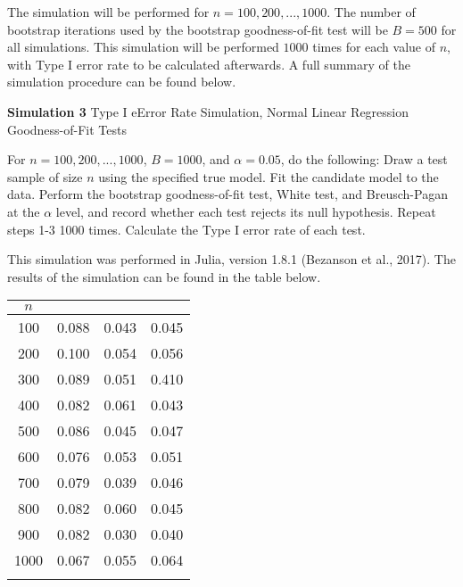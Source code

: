 		The simulation will be performed for $n = 100,200,...,1000$. The number of bootstrap iterations used by the bootstrap goodness-of-fit test will be $B = 500$ for all simulations.
		This simulation will be performed $1000$ times for each value of $n$, with Type I error rate to be calculated afterwards. A full summary of the simulation procedure can be found below.
		\begin{algorithm}[H]
			\caption*{\textbf{Simulation 3} Type I eError Rate Simulation, Normal Linear Regression Goodness-of-Fit Tests}
			\begin{algorithmic}[1]
			  \Statex For $n = 100,200,...,1000$, $B = 1000$, and $\alpha = 0.05$, do the following:
			  \State Draw a test sample of size $n$ using the specified true model.
			  \State Fit the candidate model to the data.
			  \State Perform the bootstrap goodness-of-fit test, White test, and Breusch-Pagan at the $\alpha$ level,
			  and record whether each test rejects its null hypothesis.
			  \State Repeat steps 1-3 1000 times.
			  \State Calculate the Type I error rate of each test.
			\end{algorithmic}
		\end{algorithm}

		This simulation was performed in Julia, version 1.8.1 (Bezanson et al., 2017). The results of the simulation can be found in the table below.

		\begin{table}[H]
			\centering
			\small\addtolength{\tabcolsep}{-3pt}
			\setlength\extrarowheight{-3pt}
			{
			\begin{tabular}{ c|c|c|c}
			$n$ & \vtop{\hbox{\strut Bootstrap}\hbox{\strut Test}} & \vtop{\hbox{\strut White}\hbox{\strut Test}} & \vtop{\hbox{\strut Breusch-Pagan} \hbox{\strut Test}} \\
			 \hline
			 100 & 0.088 & 0.043 & 0.045 \\
			 200 & 0.100 & 0.054 & 0.056 \\
			 300 & 0.089 & 0.051 & 0.410 \\
			 400 & 0.082 & 0.061 & 0.043 \\
			 500 & 0.086 & 0.045 & 0.047 \\
			 600 & 0.076 & 0.053 & 0.051 \\
			 700 & 0.079 & 0.039 & 0.046 \\
			 800 & 0.082 & 0.060 & 0.045 \\
			 900 & 0.082 & 0.030 & 0.040 \\
			 1000 & 0.067 & 0.055 & 0.064 \\
			 \Xhline{3\arrayrulewidth}
			\end{tabular}
			}
		\end{table}

